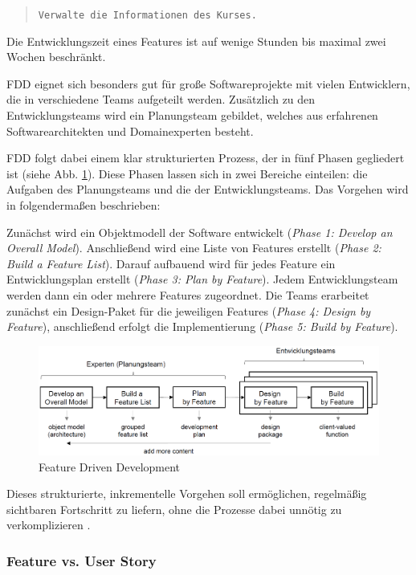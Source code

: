 \documentclass[acmtog]{acmart}
\begin{document}
\begin{quote}
	\texttt{Verwalte die Informationen des Kurses.}
\end{quote}

Die Entwicklungszeit eines Features ist auf wenige Stunden bis maximal zwei Wochen beschränkt.

FDD eignet sich besonders gut für große Softwareprojekte mit vielen Entwicklern, die in verschiedene Teams aufgeteilt werden.
Zusätzlich zu den Entwicklungsteams wird ein Planungsteam gebildet, welches aus erfahrenen Softwarearchitekten und Domainexperten besteht.

FDD folgt dabei einem klar strukturierten Prozess, der in fünf Phasen gegliedert ist (siehe Abb. \ref{fig:fdd}). Diese Phasen lassen sich in zwei Bereiche einteilen: die Aufgaben des Planungsteams und die der Entwicklungsteams. Das Vorgehen wird in \cite{coad99} folgendermaßen beschrieben:

Zunächst wird ein Objektmodell der Software entwickelt (\emph{Phase 1: Develop an Overall Model}).
Anschließend wird eine Liste von Features erstellt (\emph{Phase 2: Build a Feature List}).
Darauf aufbauend wird für jedes Feature ein Entwicklungsplan erstellt (\emph{Phase 3: Plan by Feature}).
Jedem Entwicklungsteam werden dann ein oder mehrere Features zugeordnet.
Die Teams erarbeitet zunächst ein Design-Paket für die jeweiligen Features (\emph{Phase 4: Design by Feature}),
anschließend erfolgt die Implementierung (\emph{Phase 5: Build by Feature}).

\begin{figure}[t]
	\centering
	\includegraphics[width=\linewidth]{images/fdd.png}
	\caption{Feature Driven Development}
	\label{fig:fdd}
	\Description{}
\end{figure}

Dieses strukturierte, inkrementelle Vorgehen soll ermöglichen, regelmäßig sichtbaren Fortschritt zu liefern, ohne die Prozesse dabei unnötig zu verkomplizieren \cite{hunt06}.

\subsubsection{Feature vs. User Story}
\end{document}
